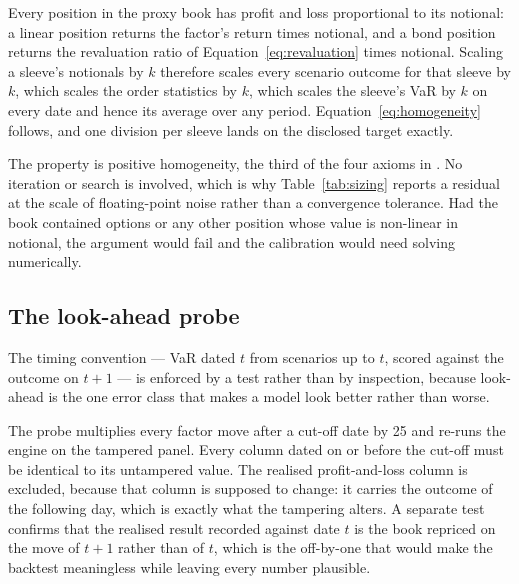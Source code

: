 Every position in the proxy book has profit and loss proportional to its
notional: a linear position returns the factor's return times notional, and a
bond position returns the revaluation ratio of
Equation~\eqref{eq:revaluation} times notional. Scaling a sleeve's notionals by
$k$ therefore scales every scenario outcome for that sleeve by $k$, which
scales the order statistics by $k$, which scales the sleeve's VaR by $k$ on
every date and hence its average over any period. Equation~\eqref{eq:homogeneity}
follows, and one division per sleeve lands on the disclosed target exactly.

The property is positive homogeneity, the third of the four axioms in
\citet{artzner1999coherent}. No iteration or search is involved, which is why
Table~\ref{tab:sizing} reports a residual at the scale of floating-point noise
rather than a convergence tolerance. Had the book contained options or any
other position whose value is non-linear in notional, the argument would fail
and the calibration would need solving numerically.

\subsection*{The look-ahead probe}

The timing convention --- VaR dated $t$ from scenarios up to $t$, scored
against the outcome on $t+1$ --- is enforced by a test rather than by
inspection, because look-ahead is the one error class that makes a model look
better rather than worse.

The probe multiplies every factor move after a cut-off date by 25 and re-runs
the engine on the tampered panel. Every column dated on or before the cut-off
must be identical to its untampered value. The realised profit-and-loss column
is excluded, because that column is supposed to change: it carries the outcome
of the following day, which is exactly what the tampering alters. A separate
test confirms that the realised result recorded against date $t$ is the book
repriced on the move of $t+1$ rather than of $t$, which is the off-by-one that
would make the backtest meaningless while leaving every number plausible.
